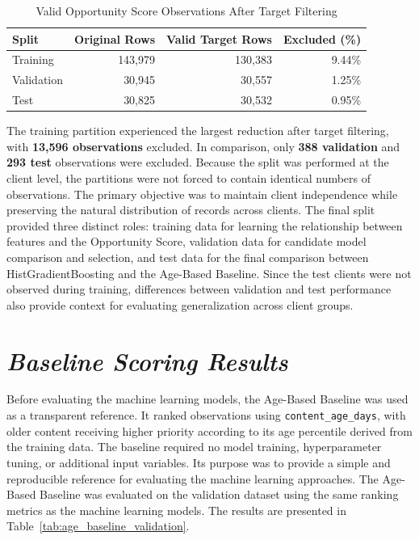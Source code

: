 \documentclass[12pt,a4paper]{report}
\begin{document}
\begin{table}[htbp]
\centering
\caption{Valid Opportunity Score Observations After Target Filtering}
\label{tab:valid_target_split_analysis}
\begin{tabular}{|l|r|r|r|}
\hline
\textbf{Split} & \textbf{Original Rows} & \textbf{Valid Target Rows} & \textbf{Excluded (\%)} \\
\hline
Training & 143,979 & 130,383 & 9.44\% \\
\hline
Validation & 30,945 & 30,557 & 1.25\% \\
\hline
Test & 30,825 & 30,532 & 0.95\% \\
\hline
\end{tabular}
\end{table}
The training partition experienced the largest reduction after target filtering, with \textbf{13,596 observations} excluded. In comparison, only \textbf{388 validation} and \textbf{293 test} observations were excluded. Because the split was performed at the client level, the partitions were not forced to contain identical numbers of observations. The primary objective was to maintain client independence while preserving the natural distribution of records across clients. The final split provided three distinct roles: training data for learning the relationship between features and the Opportunity Score, validation data for candidate model comparison and selection, and test data for the final comparison between HistGradientBoosting and the Age-Based Baseline. Since the test clients were not observed during training, differences between validation and test performance also provide context for evaluating generalization across client groups.

\section{\textit{Baseline Scoring Results}}

Before evaluating the machine learning models, the Age-Based Baseline was used as a transparent reference. It ranked observations using \texttt{content\_age\_days}, with older content receiving higher priority according to its age percentile derived from the training data. The baseline required no model training, hyperparameter tuning, or additional input variables. Its purpose was to provide a simple and reproducible reference for evaluating the machine learning approaches. The Age-Based Baseline was evaluated on the validation dataset using the same ranking metrics as the machine learning models. The results are presented in Table~\ref{tab:age_baseline_validation}.
\end{document}
